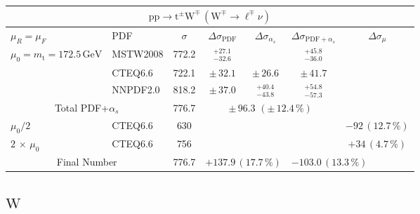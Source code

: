 \begin{table}[htb]
  \begin{center}
    \begin{tabular}{|l|l|c|c|c|c|c|}
      \hline

      \multicolumn{7}{|c|}{$\mathrm{pp}\to\mathrm{t}^\pm\mathrm{W}^\mp\,(\mathrm{W}^\mp\to\ell^\mp\nu)$} \\ \hline
      $\mu_R=\mu_F$ & PDF & $\sigma$ & $\Delta\sigma_{\mathrm{PDF}}$ & $\Delta\sigma_{\alpha_s}$ & $\Delta\sigma_{\mathrm{PDF}+\alpha_s}$ & $\Delta\sigma_{\mu}$ \\ \hline\hline

      $\mu_0=m_\mathrm{t}=172.5\,\mathrm{GeV}$ & MSTW2008 & 772.2 & $^{+27.1}_{-32.6}$ &     &  $^{+45.8}_{-36.0}$    &     \\
                                                & CTEQ6.6  & 722.1 & $\pm\,32.1$ &  $\pm\,26.6$  &  $\pm\,41.7$       &     \\
                                                & NNPDF2.0 & 818.2 & $\pm\,37.0$ &  $^{+40.4}_{-43.8}$  & $^{+54.8}_{-57.3}$     &     \\ \hline\hline
      \multicolumn{2}{|c|}{Total PDF+$\alpha_s$}      &  776.7    & \multicolumn{3}{c|}{$\pm\,96.3\,\,(\pm\,12.4\,\%)$} & \\ \hline\hline
      $\mu_0/2$                                 & CTEQ6.6 & 630 & \multicolumn{3}{c|}{} & $-92\,(12.7\,\%)$ \\ 
      $2\,\times\,\mu_0$                        & CTEQ6.6 & 756 & \multicolumn{3}{c|}{} & $+34\,(4.7\,\%)$ \\  \hline\hline
      \multicolumn{2}{|c|}{Final Number} & 776.7 & \multicolumn{2}{l}{$+137.9\,(17.7\,\%)$} & \multicolumn{2}{l|}{$-103.0\,(13.3\,\%)$} \\


\hline 
\end{tabular}
\end{center}
\end{table} 


\subsection*{\boldmath $\mathrm{W}$}


